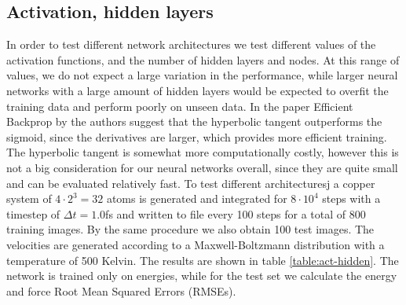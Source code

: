 \subsection{Activation, hidden layers}
In order to test different network architectures
we test different values of the activation functions, and the number
of hidden layers and nodes. 
At this range of values, we do not expect a large variation in the performance,
while larger neural networks with a large amount of hidden layers
would be expected to overfit the training data and perform
poorly on unseen data.
In the paper Efficient Backprop by \parencite[Lecun et al.]{
lecun2012efficient} the authors suggest that the hyperbolic
tangent outperforms the sigmoid, since the derivatives
are larger, which provides more efficient training.
The hyperbolic tangent is somewhat more computationally costly,
however this is not a big consideration for our neural networks
overall, since they are quite small and can be evaluated
relatively fast.
To test different architecturesj a copper system of $4 \cdot 2^3 = 32$
atoms is generated and integrated for $8 \cdot 10^4$ steps
with a timestep of $\Delta t = 1.0$fs
and written to file every 100 steps for a total of 800 training images.
By the same procedure we also obtain 100 test images.
The velocities are generated
according to a Maxwell-Boltzmann distribution with a temperature
of 500 Kelvin. The results are shown in table \ref{table:act-hidden}.
The network is trained only on energies, while for the test set
we calculate the energy and force Root Mean Squared Errors (RMSEs).


